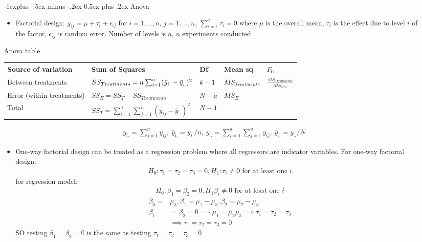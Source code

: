 \documentclass[frenchspacing,9pt,landscape,a4paper]{article}
\makeatletter
\renewcommand{\subsection}{\@startsection{subsection}{2}{0mm}%
                                {-1explus -.5ex minus -.2ex}%
                                {0.5ex plus .2ex}%
                                {\normalfont\normalsize\bfseries}}
\makeatother
\begin{document}
\begin{multicols}{3}
\subsection{Anova}
\begin{itemize}
	\item Factorial design: $y_{ij}=\mu+\tau_i+\epsilon_{ij}$ for $i=1,\dots,a$, $j=1,\dots,n$, $\sum_{i=1}^a\tau_i=0$ where $\mu$ is the overall mean,  $\tau_i$ is the effect due to level  $i$ of the factor,  $\epsilon_{ij}$ is random error. Number of levels is $a$, $n$ experiments conducted
\end{itemize}
Anova table
\begin{centering}
	\begin{tabular}{p{1cm} p{2.7cm} l p{1cm} p{1cm}}
		\hline
		Source of variation & Sum of Squares & Df & Mean sq & $F_0$\\
		\hline
		Between treatments & $SS_{Treatments}\newline=n\sum_{i=1}^a(\bar{y}_{i.}-\bar{y}_{..})^2$ &  $k-1$ &  $MS_{Treatments}$ &  $\frac{MS_{Treatments}}{MS_{Res}}$\\
		Error (within treatments) & $SS_E=SS_T-SS_{Treatments}$ &  $N-a$ &  $MS_E$ & \\
		Total &   $SS_T=\sum_{i=1}^a\sum_{j=1}^n(y_{ij}-\bar{y}_{..})^2$ &  $N-1$ & & \\
		\hline
	\end{tabular}
\end{centering}
\begin{align*}
	y_{i.}=\sum_{j=1}^n y_{ij},\ \bar{y}_{i.}=y_{i.}/n,\ y_{..}=\sum_{i=1}^a\sum_{j=1}^n y_{ij},\ \bar{y}_{..}=y_{..}/N 
\end{align*}
\begin{itemize}
	\item One-way factorial design can be treated as a regression problem where all regressors are indicator variables. For one-way factorial design:
	\begin{align*}
		H_0:\tau_1=\tau_2=\tau_3=0, H_1:\tau_i\neq 0\text{ for at least one } i
	\end{align*} for regression model:
	\begin{align*}
		H_0:\beta_1=\beta_2=0,H_1\beta_i\neq 0\text{ for at least one } i
	\end{align*}
	\begin{align*}
		\beta_0=&\mu_3,\beta_1=\mu_1-\mu_3,\beta_2=\mu_2-\mu_3\\
		\beta_1&=\beta_2=0\implies\mu_1=\mu_2\mu_3\implies\tau_1=\tau_2=\tau_3\\
			   &\implies\tau_1=\tau_2=\tau_3=0
	\end{align*} SO testing $\beta_1=\beta_2=0$ is the same as testing $\tau_1=\tau_2=\tau_3=0$
\end{itemize}

\end{multicols}
\end{document}
